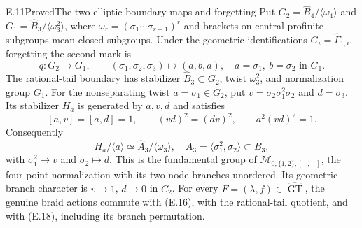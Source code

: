 \begin{result}{E.11}{Proved}{The two elliptic boundary maps and forgetting}
Put $G_2=\widehat B_4/\langle\omega _4\rangle$ and
$G_1=\widehat B_3/\langle\omega _3^2\rangle$, where
$\omega _r=(\sigma _1\cdots\sigma _{r-1})^r$ and brackets on
central profinite subgroups mean closed subgroups.  Under the
geometric identifications $G_i=\widehat\Gamma_{1,i}$, forgetting
the second mark is
\[
 q:G_2\longrightarrow G_1,\qquad
 (\sigma _1,\sigma _2,\sigma _3)\longmapsto(a,b,a),
 \quad a=\sigma _1,\ b=\sigma _2\text{ in }G_1.       \tag{E.16}
\]
The rational-tail boundary has stabilizer $\widehat B_3\subset G_2$,
twist $\omega _3^2$, and normalization group $G_1$.
For the nonseparating twist $a=\sigma _1\in G_2$, put
$v=\sigma _2\sigma _1^2\sigma _2$ and $d=\sigma _3$.
Its stabilizer $H_a$ is generated by $a,v,d$ and satisfies
\[
 [a,v]=[a,d]=1,\qquad (vd)^2=(dv)^2,\qquad
                    a^2(vd)^2=1.                         \tag{E.17}
\]
Consequently
\[
 H_a/\langle a\rangle\simeq
 \widehat A_3/\langle\omega _3\rangle,
 \quad A_3=\langle\sigma _1^2,\sigma _2\rangle\subset B_3,
                                                               \tag{E.18}
\]
with $\sigma _1^2\mapsto v$ and $\sigma _2\mapsto d$.
This is the fundamental group of
$\mathcal M_{0,\{1,2\},[+,-]}$, the four-point normalization
with its two node branches unordered.  Its geometric branch
character is $v\mapsto1$, $d\mapsto0$ in $C_2$.
For every
$F=(\lambda,f)\in\widehat{\operatorname{GT}}$, the genuine
braid actions commute with (E.16), with the rational-tail
quotient, and with (E.18), including its branch permutation.
\end{result}
